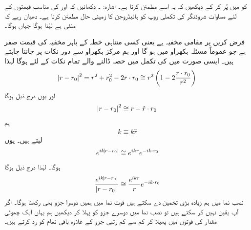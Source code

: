  کو  میں پُر کر کے دیکھیں کہ یہ اسے مطمئن کرتا ہے۔ اشارہ: ۔
دکھائیں کہ  اور  کی مناسب قیمتوں کے لئے مساوات شروڈنگر کی تکملی روپ کو ہائیڈروجن کا زمینی حال  مطمئن کرتا ہے۔ دھیان رہے کہ  منفی ہے لہٰذا  ہوگا جہاں  ہوگا۔


فرض کریں  پر  مقامی مخفیہ ہے یعنی کسی متناہی خطہ کے باہر مخفیہ کی قیمت صفر ہے جو عموماً مسئلہ بکھراو میں ہو گا اور ہم مرکز بکھراو سے دور نکات پر  جاننا چاہتے ہیں۔ ایسی صورت میں  کی تکمل میں حصہ ڈالنے والے تمام نکات کے لئے  ہوگا لہٰذا
\begin{align}
	\abs{r-r_0}^2 = r^2+r_0^2-2r\cdot r_0 \cong r^2\left(1-2\frac{r\cdot r_0}{r^2}\right)
\end{align}
اور یوں درج ذیل ہوگا
\begin{align}
	\abs{r-r_0}^2\cong r-\hat{r}\cdot r_0
\end{align}
ہم 
\begin{align}
	k\equiv k\hat{r}
\end{align}
لیتے ہیں۔ یوں
\begin{align}
	e^{ik\abs{r-r_0}}\cong e^{ikr}e^{-ik\cdot r_0}
\end{align}
ہوگا۔ لہٰذا درج ذیل ہوگا 
\begin{align}
	\frac{e^{ik\abs{r-r_0}}}{\abs{r-r_0}}\cong\frac{e^{ikr}}{r}e^{-ik\cdot r_0}
\end{align}
نصب نما میں ہم زیادہ بڑی تخمین  دے سکتے ہیں قوت نما میں ہمیں دوسرا جزو بھی رکھنا ہوگا۔ اگر آپ یقین نہیں کر سکتے ہیں تو نصب نما میں دوسرے جزو کو پہلا کر دیکھیں ہم یہاں ایک چھوٹی مقدار  کی قوتوں میں پھیلا کر کم سے کم رتبی جزو کے علاوہ باقی تمام کو رد کرتے ہیں۔

